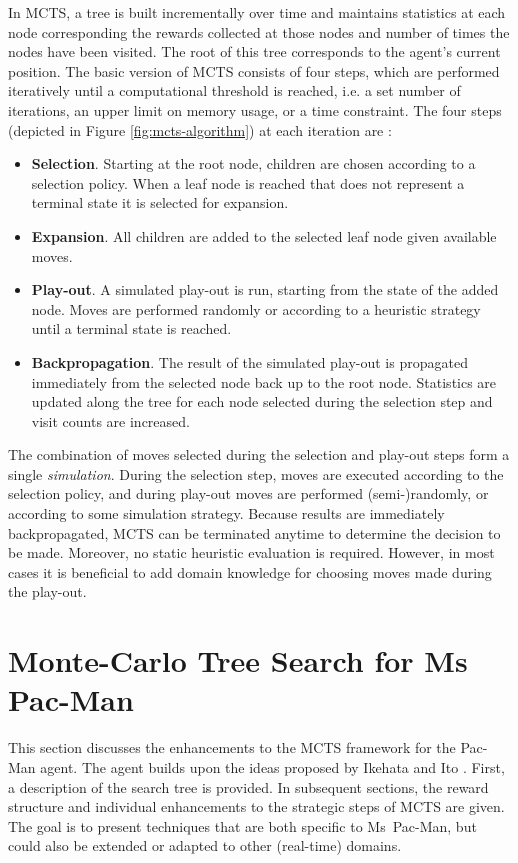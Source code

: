 \documentclass[journal]{IEEEtran}
\begin{document}
In MCTS, a tree is built incrementally over time and maintains statistics at each node corresponding the rewards collected at those nodes and number of times the nodes have been visited. The root of this tree corresponds to the agent's current position. The basic version of MCTS consists of four steps, which are performed iteratively until a computational threshold is reached, i.e. a set number of iterations, an upper limit on memory usage, or a time constraint. The four steps (depicted in Figure \ref{fig:mcts-algorithm}) at each iteration are \cite{chaslot2008progressive}:
\begin{itemize}
\item {\bf Selection}. Starting at the root node, children are chosen according to a selection policy. When a leaf node is reached that does not represent a terminal state it is selected for expansion.
\item {\bf Expansion}. All children are added to the selected leaf node given available moves.
\item {\bf Play-out}. A simulated play-out is run, starting from the state of the added node. Moves are performed randomly or according to a heuristic strategy until a terminal state is reached.
\item {\bf Backpropagation}. The result of the simulated play-out is propagated immediately from the selected node back up to the root node. Statistics are updated along the tree for each node selected during the selection step and visit counts are increased.
\end{itemize}
The combination of moves selected during the selection and play-out steps form a single \emph{simulation}. During the selection step, moves are executed according to the selection policy, and during play-out moves are performed (semi-)randomly, or according to some simulation strategy.
Because results are immediately backpropagated, MCTS can be terminated anytime to determine the decision to be made. Moreover, no static heuristic evaluation is required. However, in most cases it is beneficial to add domain knowledge for choosing moves made during the play-out. 

\section{Monte-Carlo Tree Search for Ms Pac-Man}
This section discusses the enhancements to the MCTS framework for the Pac-Man agent. The agent builds upon the ideas proposed by Ikehata and Ito \cite{ikehata2011monte}. First, a description of the search tree is provided. In subsequent sections, the reward structure and individual enhancements to the strategic steps of MCTS are given. The goal is to present techniques that are both specific to Ms~Pac-Man, but could also be extended or adapted to other (real-time) domains.
\end{document}
